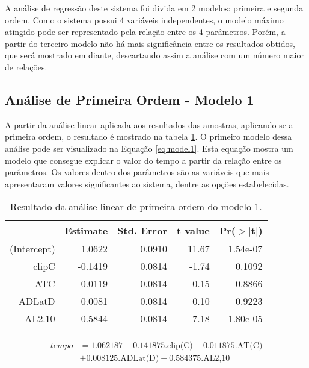 A análise de regressão deste sistema foi divida em 2 modelos: primeira e segunda ordem. Como o sistema possui 4 variáveis independentes, o modelo máximo atingido pode ser representado pela relação entre os 4 parâmetros. Porém, a partir do terceiro modelo não há mais significância entre os resultados obtidos, que será mostrado em diante, descartando assim a análise com um número maior de relações. 

\subsection{Análise de Primeira Ordem - Modelo 1}

A partir da análise linear aplicada aos resultados das amostras, aplicando-se a primeira ordem, o resultado é mostrado na tabela \ref{tab:model1}. O primeiro modelo dessa análise pode ser visualizado na Equação \ref{eq:model1}. Esta equação mostra um modelo que consegue explicar o valor do tempo a partir da relação entre os parâmetros. Os valores dentro dos parâmetros são as variáveis que mais apresentaram valores significantes ao sistema, dentre as opções estabelecidas. 

\begin{table}[ht]
    \centering
    \caption{Resultado da análise linear de primeira ordem do modelo 1.}
    \begin{tabular}{rrrrr}
      \hline
     & Estimate & Std. Error & t value & Pr($>$$|$t$|$) \\ 
      \hline
    (Intercept) & 1.0622 & 0.0910 & 11.67 & 1.54e-07 \\ 
      clipC & -0.1419 & 0.0814 & -1.74 & 0.1092 \\ 
      ATC & 0.0119 & 0.0814 & 0.15 & 0.8866 \\ 
      ADLatD & 0.0081 & 0.0814 & 0.10 & 0.9223 \\ 
      AL2.10 & 0.5844 & 0.0814 & 7.18 & 1.80e-05 \\ 
       \hline
    \end{tabular}
    \label{tab:model1}
\end{table}

\begin{align}
    \begin{split}
    tempo &= 1.062187 - 0.141875\text{.clip(C)} + 0.011875\text{.AT(C)} \\
    & + 0.008125\text{.ADLat(D)} + 0.584375\text{.AL2,10}
    \end{split}
    \label{eq:model1}
\end{align}

